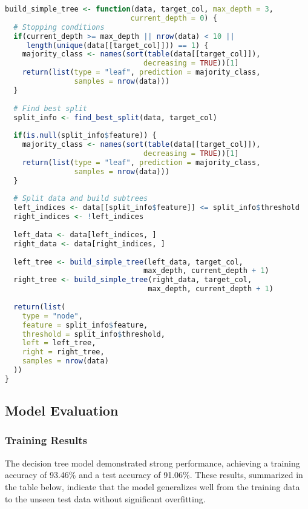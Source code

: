 \begin{lstlisting}[language=R, caption=Decision Tree Building Function]
build_simple_tree <- function(data, target_col, max_depth = 3, 
                             current_depth = 0) {
  # Stopping conditions
  if(current_depth >= max_depth || nrow(data) < 10 || 
     length(unique(data[[target_col]])) == 1) {
    majority_class <- names(sort(table(data[[target_col]]), 
                                decreasing = TRUE))[1]
    return(list(type = "leaf", prediction = majority_class, 
                samples = nrow(data)))
  }
  
  # Find best split
  split_info <- find_best_split(data, target_col)
  
  if(is.null(split_info$feature)) {
    majority_class <- names(sort(table(data[[target_col]]), 
                                decreasing = TRUE))[1]
    return(list(type = "leaf", prediction = majority_class, 
                samples = nrow(data)))
  }
  
  # Split data and build subtrees
  left_indices <- data[[split_info$feature]] <= split_info$threshold
  right_indices <- !left_indices
  
  left_data <- data[left_indices, ]
  right_data <- data[right_indices, ]
  
  left_tree <- build_simple_tree(left_data, target_col, 
                                max_depth, current_depth + 1)
  right_tree <- build_simple_tree(right_data, target_col, 
                                 max_depth, current_depth + 1)
  
  return(list(
    type = "node",
    feature = split_info$feature,
    threshold = split_info$threshold,
    left = left_tree,
    right = right_tree,
    samples = nrow(data)
  ))
}
\end{lstlisting}

\subsection{Model Evaluation}

\subsubsection{Training Results}

The decision tree model demonstrated strong performance, achieving a training accuracy of 93.46\% and a test accuracy of 91.06\%. These results, summarized in the table below, indicate that the model generalizes well from the training data to the unseen test data without significant overfitting.

